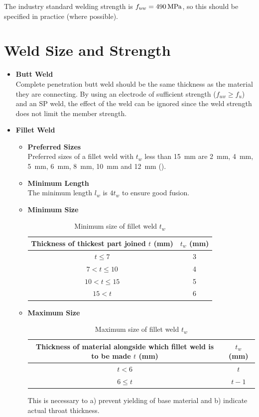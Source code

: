 The industry standard welding strength is $f_{uw}=\SI{490}{\mega\pascal}$, so this should be specified in practice (where possible).
\section{Weld Size and Strength}
\begin{itemize}
\item \textbf{Butt Weld}\\Complete penetration butt weld should be the same thickness as the material they are connecting.
By using an electrode of sufficient strength ($f_{uw}\geqslant{}f_u$) and an SP weld, the effect of the weld can be ignored since the weld strength does not limit the member strength.
\item \textbf{Fillet Weld}
\begin{itemize}
\item \textbf{Preferred Sizes}\\Preferred sizes of a fillet weld with $t_w$ less than \SI{15}{\mm} are \SI{2}{\mm}, \SI{4}{\mm}, \SI{5}{\mm}, \SI{6}{\mm}, \SI{8}{\mm}, \SI{10}{\mm} and \SI{12}{\mm} ().
\item \textbf{Minimum Length}\\The minimum length $l_w$ is $4t_w$ to ensure good fusion.
\item \textbf{Minimum Size}
\begin{table}[H]
\centering\footnotesize\caption{Minimum size of fillet weld $t_w$}
\begin{tabular}{cc}
	\toprule
	Thickness of thickest part joined $t$ (\si{\mm}) & $t_w$ (\si{\mm}) \\ \midrule
	                 $t\leqslant7$                   &     \num{3}      \\
	                $7<t\leqslant10$                 &     \num{4}      \\
	               $10<t\leqslant15$                 &     \num{5}      \\
	                     $15<t$                      &     \num{6}      \\ \bottomrule
\end{tabular}
\end{table}
\item \textbf{Maximum Size}
\begin{table}[H]
\centering\footnotesize\caption{Maximum size of fillet weld $t_w$}
\begin{tabular}{cc}
	\toprule
	Thickness of material alongside which fillet weld is to be made $t$ (\si{\mm}) & $t_w$ (\si{\mm}) \\ \midrule
	                                    $t<6$                                      &       $t$        \\
	                               $6\leqslant{}t$                                 &      $t-1$       \\ \bottomrule
\end{tabular}
\end{table}
This is necessary to a) prevent yielding of base material and b) indicate actual throat thickness.
\end{itemize}
\end{itemize}

